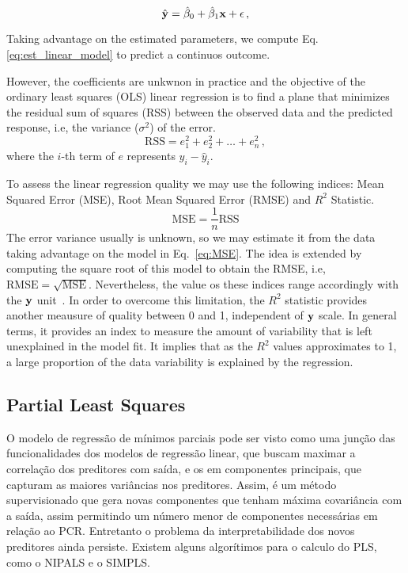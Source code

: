 \begin{equation}
\hat{{\bf y}} = \hat{\beta}_{0} + \hat{\beta}_{1} {\bf x} + {\bf \epsilon} \, ,
\label{eq:est_linear_model}
\end{equation}

Taking advantage on the estimated parameters, we compute Eq. \ref{eq:est_linear_model} to predict a continuos outcome. 

However, the coefficients are unkwnon in practice and the objective of the ordinary least squares (OLS) linear regression is to find a plane that minimizes the residual sum of squares (RSS) between the observed data and the predicted response, i.e, the variance ($\sigma^2$) of the error.     
\begin{equation}
  \text{RSS} = e_1^2 + e_2^2 + \dots + e_n^2 \, , \label{eq:RSS}
\end{equation}
where the $i$-th term of $e$ represents $y_i - \hat{y}_i$.

To assess the linear regression quality we may use the following indices: Mean Squared Error (MSE), Root Mean Squared Error (RMSE) and $R^2$ Statistic.
\begin{equation}
  \text{MSE} = \frac{1}{n} \text{RSS}
  \label{eq:MSE}
\end{equation}
The error variance usually is unknown, so we may estimate it from the data taking advantage on the model in Eq.~\ref{eq:MSE}. The idea is extended by computing the square root of this model to obtain the RMSE, i.e, $\text{RMSE} = \sqrt{\text{MSE}}$. Nevertheless, the value os these indices range accordingly with the ${\bf y}$ unit~\cite{Kuhn2013}. In order to overcome this limitation, the $R^2$ statistic provides another meausure of quality between 0 and 1, independent of ${\bf y}$ scale. In general terms, it provides an index to measure the amount of variability that is left unexplained in the model fit. It implies that as the $R^2$ values approximates to 1, a large proportion of the data variability is explained by the regression.

\subsection{Partial Least Squares}
O modelo de regressão de mínimos parciais pode ser visto como uma junção das funcionalidades dos modelos de regressão linear, que buscam maximar a correlação dos preditores com saída, e os em componentes principais, que capturam as maiores variâncias nos preditores. Assim, é um método supervisionado que gera novas componentes que tenham máxima covariância com a saída, assim permitindo um número menor de componentes necessárias em relação ao PCR. Entretanto o problema da interpretabilidade dos novos preditores ainda persiste. Existem alguns algorítimos para o calculo do PLS, como o NIPALS e o SIMPLS.


